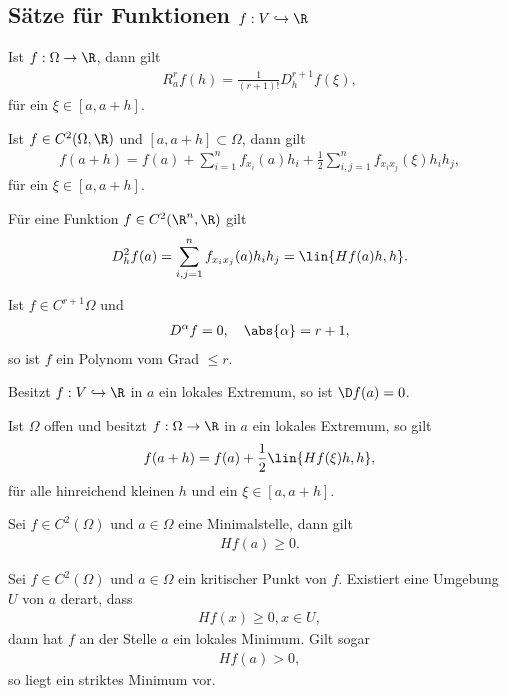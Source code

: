 \subsection{Sätze für Funktionen $f: V\hookrightarrow \R$}
\begin{prop}
Ist $f: \Omega\to\R$, dann gilt
\begin{align*}
R_a^rf(h) = \frac{1}{(r+1)!}D_h^{r+1}f(\xi),
\end{align*}
für ein $\xi\in[a,a+h]$.
\end{prop}
\begin{prop}[Spezialfall]
Ist $f\in C^2(\Omega,\R)$ und $[a,a+h]\subset\Omega$, dann gilt
\begin{align*}
f(a+h) = f(a) + \sum\limits_{i=1}^n f_{x_i}(a)h_i +
\frac{1}{2}\sum\limits_{i,j=1}^n f_{x_ix_j}(\xi)h_ih_j,
\end{align*}
für ein $\xi\in[a,a+h]$.
\end{prop}
\begin{prop}
Für eine Funktion $f\in C^2(\R^n,\R)$ gilt
\begin{align*}
D_h^2f(a) = \sum\limits_{i,j=1}^n f_{x_ix_j}(a)h_ih_j = \lin{Hf(a)h,h}.
\end{align*}
\end{prop}
\begin{prop}
Ist $f\in C^{r+1}{\Omega}$ und
\begin{align*}
D^\alpha f = 0, \quad\abs{\alpha} = r+1,
\end{align*}
so ist $f$ ein Polynom vom Grad $\le r$.
\end{prop}
\begin{prop}
Besitzt $f: V\hookrightarrow \R$ in $a$ ein lokales Extremum, so ist $\D f(a) =
0$.
\end{prop}
\begin{prop}
Ist $\Omega$ offen und besitzt $f: \Omega\to \R$ in $a$ ein lokales
Extremum, so gilt
\begin{align*}
f(a+h) = f(a) + \frac{1}{2}\lin{Hf(\xi)h,h},
\end{align*}
für alle hinreichend kleinen $h$ und ein $\xi\in[a,a+h]$.
\end{prop}
\begin{prop}
Sei $f\in C^2(\Omega)$ und $a\in\Omega$ eine Minimalstelle, dann gilt
\begin{align*}
Hf(a) \ge 0.
\end{align*}
\end{prop}
\begin{prop}
Sei $f\in C^2(\Omega)$ und $a\in\Omega$ ein kritischer Punkt von $f$. Existiert
eine Umgebung $U$ von $a$ derart, dass
\begin{align*}
Hf(x) \ge 0, x\in U,
\end{align*}
dann hat $f$ an der Stelle $a$ ein lokales Minimum. Gilt sogar
\begin{align*}
Hf(a) > 0,
\end{align*}
so liegt ein striktes Minimum vor.   
\end{prop}
